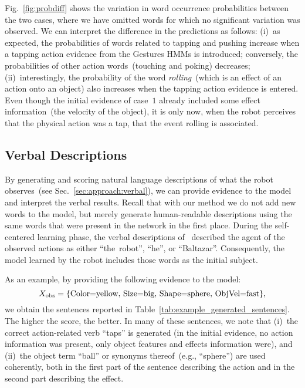 Fig.~\ref{fig:probdiff} shows the variation in word occurrence probabilities between the two cases, where we have omitted words for which no significant variation was observed.
We can interpret the difference in the predictions as follows: (i)~as expected, the probabilities of words related to tapping and pushing increase when a tapping action evidence from the Gestures \acp{HMM} is introduced; conversely, the probabilities of other action words~(touching and poking) decreases; (ii)~interestingly, the probability of the word \emph{rolling}~(which is an effect of an action onto an object) also increases when the tapping action evidence is entered. Even though the initial evidence of case~$1$ already included some effect information~(the velocity of the object), it is only now, when the robot perceives that the physical action was a tap, that the event rolling is associated.

\subsection{Verbal Descriptions}


By generating and scoring natural language descriptions of what the robot observes~(see Sec.~\ref{sec:approach:verbal}), we can provide evidence to the model and interpret the verbal results.
Recall that with our method we do not add new words to the model, but merely generate human-readable descriptions using the same words that were present in the \AffWords{} network in the first place.
During the self-centered learning phase, the verbal descriptions of~\cite{salvi:2012:smcb} described the agent of the observed actions as either ``the~robot'', ``he'', or ``Baltazar''.
Consequently, the \AffWords{} model learned by the robot includes those words as the initial subject.

As an example, by providing the following evidence to the model:
\begin{equation} \label{eq:evidence_example}
    \xobs = \{\text{Color=yellow, Size=big, Shape=sphere, ObjVel=fast}\},
\end{equation}
we obtain
the sentences reported in Table~\ref{tab:example_generated_sentences}.
The higher the score, the better.
In many of these sentences, we note that (i)~the correct action-related verb ``taps'' is generated (in the initial evidence, no action information was present, only object features and effects information were), and (ii)~the object term ``ball'' or synonyms thereof~(e.g., ``sphere'') are used coherently, both in the first part of the sentence describing the action and in the second part describing the effect.

